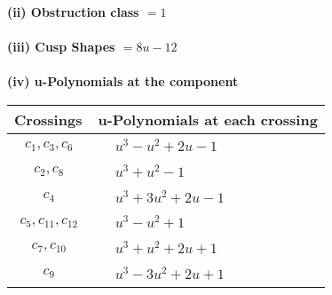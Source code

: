 \documentclass[1p]{elsarticle_modified}
\theoremstyle{definition}
\begin{document}
\flushleft \textbf{(ii) Obstruction class $= 1$}\\~\\
\flushleft \textbf{(iii) Cusp Shapes $= 8 u-12$}\\~\\
\newpage\renewcommand{\arraystretch}{1}
\flushleft \textbf{(iv) u-Polynomials at the component}\newline \\
\begin{tabular}{m{50pt}|m{274pt}}
Crossings & \hspace{64pt}u-Polynomials at each crossing \\
\hline $$\begin{aligned}c_{1},c_{3},c_{6}\end{aligned}$$&$\begin{aligned}
&u^3- u^2+2 u-1
\end{aligned}$\\
\hline $$\begin{aligned}c_{2},c_{8}\end{aligned}$$&$\begin{aligned}
&u^3+u^2-1
\end{aligned}$\\
\hline $$\begin{aligned}c_{4}\end{aligned}$$&$\begin{aligned}
&u^3+3 u^2+2 u-1
\end{aligned}$\\
\hline $$\begin{aligned}c_{5},c_{11},c_{12}\end{aligned}$$&$\begin{aligned}
&u^3- u^2+1
\end{aligned}$\\
\hline $$\begin{aligned}c_{7},c_{10}\end{aligned}$$&$\begin{aligned}
&u^3+u^2+2 u+1
\end{aligned}$\\
\hline $$\begin{aligned}c_{9}\end{aligned}$$&$\begin{aligned}
&u^3-3 u^2+2 u+1
\end{aligned}$\\
\hline
\end{tabular}\\~\\
\end{document}

